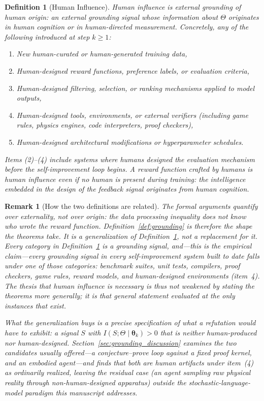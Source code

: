 \documentclass[11pt,a4paper]{article}
\newtheorem{definition}[theorem]{Definition}
\newtheorem{remark}[theorem]{Remark}
\begin{document}
\begin{definition}[Human Influence]
\label{def:human}
\emph{Human influence} is external grounding of human origin: an external grounding signal whose information about $\Theta$ originates in human cognition or in human-directed measurement. Concretely, any of the following introduced at step $k \geq 1$:
\begin{enumerate}
    \item New human-curated or human-generated training data,
    \item Human-designed reward functions, preference labels, or evaluation criteria,
    \item Human-designed filtering, selection, or ranking mechanisms applied to model outputs,
    \item Human-designed tools, environments, or external verifiers (including game rules, physics engines, code interpreters, proof checkers),
    \item Human-designed architectural modifications or hyperparameter schedules.
\end{enumerate}
Items (2)--(4) include systems where humans designed the evaluation mechanism \emph{before} the self-improvement loop begins. A reward function crafted by humans is human influence even if no human is present during training: the intelligence embedded in the design of the feedback signal originates from human cognition.
\end{definition}

\begin{remark}[How the two definitions are related]
\label{rem:grounding}
The formal arguments quantify over externality, not over origin: the data processing inequality does not know who wrote the reward function. Definition~\ref{def:grounding} is therefore the shape the theorems take. It is a \emph{generalization} of Definition~\ref{def:human}, not a replacement for it. Every category in Definition~\ref{def:human} is a grounding signal, and---this is the empirical claim---every grounding signal in every self-improvement system built to date falls under one of those categories: benchmark suites, unit tests, compilers, proof checkers, game rules, reward models, and human-designed environments (item~4). The thesis that human influence is necessary is thus not weakened by stating the theorems more generally; it is that general statement evaluated at the only instances that exist.

What the generalization buys is a precise specification of what a refutation would have to exhibit: a signal $S$ with $I(S;\Theta \mid \bm{\theta}_k) > 0$ that is neither human-produced nor human-designed. Section~\ref{sec:grounding_discussion} examines the two candidates usually offered---a conjecture--prove loop against a fixed proof kernel, and an embodied agent---and finds that both are human artifacts under item~(4) as ordinarily realized, leaving the residual case (an agent sampling raw physical reality through non-human-designed apparatus) outside the stochastic-language-model paradigm this manuscript addresses.
\end{remark}
\end{document}
